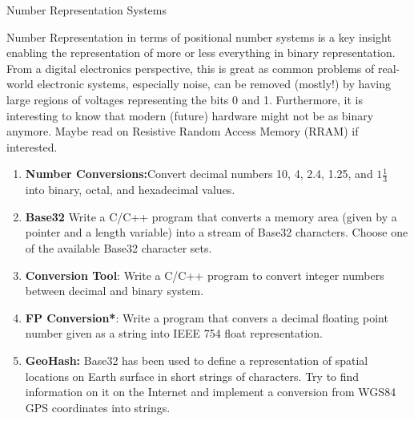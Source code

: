 \begin{task}{Number Representation Systems}{}{}

  Number Representation in terms of positional number systems is a key insight enabling the representation of more or less
  everything in binary representation. From a digital electronics perspective, this is great as common problems of real-world electronic systems, especially noise, can be removed (mostly!) by having large regions of voltages representing the bits 0 and 1. Furthermore, it is interesting to know that modern (future) hardware might not be as binary anymore. Maybe read on Resistive Random Access Memory (RRAM) if interested.

    
  \begin{enumerate}
  \item{\textbf{Number Conversions:}Convert decimal numbers 10, 4, 2.4, 1.25, and $1 \frac{1}{3}$ into binary, octal, and hexadecimal values.}
  \item{\textbf{Base32} Write a C/C++ program that converts a memory area (given by a pointer and a length variable) into a stream of Base32 characters. Choose one of the available Base32 character sets.}
  \item{\textbf{Conversion Tool}: Write a C/C++ program to convert integer numbers between decimal and binary system.}
  \item{\textbf{FP Conversion*}: Write a program that convers a decimal floating point number given as a string into IEEE 754 float representation.}
    \item{\textbf{GeoHash:} Base32 has been used to define a representation of spatial locations on Earth surface in short strings of characters. Try to find information on it on the Internet and implement a conversion from WGS84 GPS coordinates into strings.}
  \end{enumerate}
%

  
  
\end{task}
